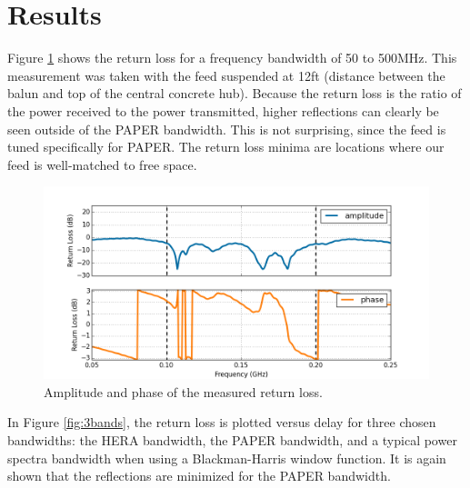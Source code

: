 \documentclass[12pt,preprint]{aastex}
\begin{document}
\section{Results}

Figure \ref{fig:freq} shows the return loss for a frequency bandwidth of 50 to 500MHz. This measurement was taken with the feed suspended at 12ft (distance between the balun and top of the central concrete hub). Because the return loss is the ratio of the power received to the power transmitted, higher reflections can clearly be seen outside of the PAPER bandwidth. This is not surprising, since the feed is tuned specifically for PAPER. The return loss minima are locations where our feed is well-matched to free space.

\begin{figure}
\centering
\includegraphics[totalheight=0.4\textheight]{plots/frequency_amp_phase.png}
\caption{Amplitude and phase of the measured return loss.}
\label{fig:freq}
\end{figure}

In Figure \ref{fig:3bands}, the return loss is plotted versus delay for three chosen bandwidths: the HERA bandwidth, the PAPER bandwidth, and a typical power spectra bandwidth when using a Blackman-Harris window function. It is again shown that the reflections are minimized for the PAPER bandwidth. 
\end{document}
